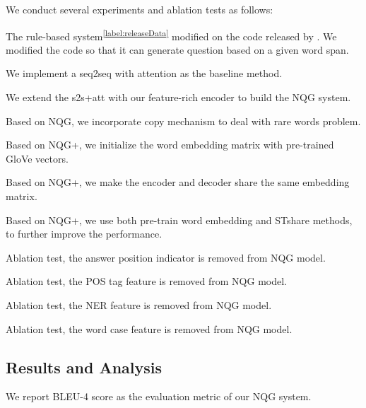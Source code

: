 \documentclass[11pt,letterpaper]{article}
\newcommand{\ourModelName}{NQG}
\begin{document}
We conduct several experiments and ablation tests as follows:
\begin{description}[noitemsep]
	\item[PCFG-Trans] The rule-based system\textsuperscript{\ref{label:releaseData}} modified on the code released by \citet{heilman2011automatic}.
	We modified the code so that it can generate question based on a given word span.
	\item[s2s+att] We implement a seq2seq with attention as the baseline method.
	\item[\ourModelName{}] We extend the s2s+att with our feature-rich encoder to build the \ourModelName{} system.
	\item[\ourModelName{}+] Based on \ourModelName{}, we incorporate copy mechanism to deal with rare words problem.
	\item[\ourModelName{}+Pretrain] Based on \ourModelName{}+, we initialize the word embedding matrix with pre-trained GloVe \citep{pennington2014glove} vectors.
\item[\ourModelName{}+STshare] Based on \ourModelName{}+, we make the encoder and decoder share the same embedding matrix.
	\item[\ourModelName{}++] Based on \ourModelName{}+, we use both pre-train word embedding and STshare methods, to further improve the performance.
	\item[\ourModelName{}$ - $Answer] Ablation test, the answer position indicator is removed from \ourModelName{} model.
	\item[\ourModelName{}$ - $POS] Ablation test, the POS tag feature is removed from \ourModelName{} model.
	\item[\ourModelName{}$ - $NER] Ablation test, the NER feature is removed from \ourModelName{} model.
	\item[\ourModelName{}$ - $Case] Ablation test, the word case feature is removed from \ourModelName{} model.
\end{description}



\subsection{Results and Analysis}

We report BLEU-4 score \cite{papineni2002bleu} as the evaluation metric of our \ourModelName{} system.
\end{document}

